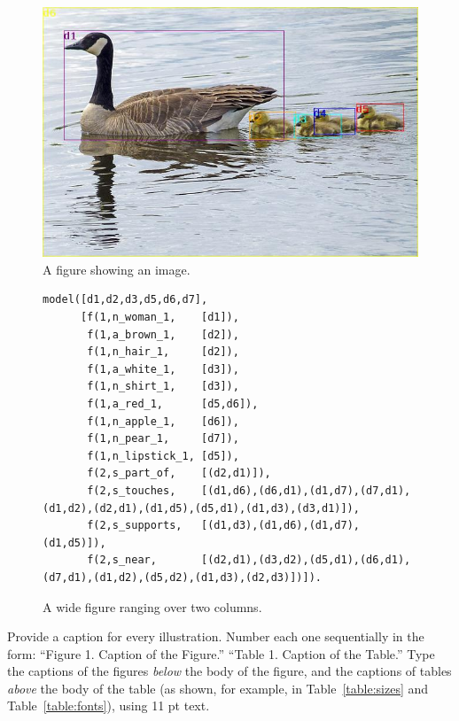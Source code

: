 \documentclass[11pt]{article}
\begin{document}
\begin{figure}[hbtp]
\includegraphics[width=\columnwidth]{canada-goose-436090_640_bb.jpg}
\caption{A figure showing an image.\label{fig:geese}}
\end{figure}

\begin{figure}[hbtp]
\scriptsize
\noindent\makebox[\linewidth]{\rule{\textwidth}{1pt}}
\begin{verbatim}
model([d1,d2,d3,d5,d6,d7],
      [f(1,n_woman_1,    [d1]),
       f(1,a_brown_1,    [d2]),
       f(1,n_hair_1,     [d2]),
       f(1,a_white_1,    [d3]),
       f(1,n_shirt_1,    [d3]),
       f(1,a_red_1,      [d5,d6]),
       f(1,n_apple_1,    [d6]),
       f(1,n_pear_1,     [d7]),
       f(1,n_lipstick_1, [d5]),
       f(2,s_part_of,    [(d2,d1)]),
       f(2,s_touches,    [(d1,d6),(d6,d1),(d1,d7),(d7,d1),(d1,d2),(d2,d1),(d1,d5),(d5,d1),(d1,d3),(d3,d1)]),
       f(2,s_supports,   [(d1,d3),(d1,d6),(d1,d7),(d1,d5)]),
       f(2,s_near,       [(d2,d1),(d3,d2),(d5,d1),(d6,d1),(d7,d1),(d1,d2),(d5,d2),(d1,d3),(d2,d3)])]).
\end{verbatim}
\noindent\makebox[\linewidth]{\rule{\textwidth}{1pt}}
\caption{A wide figure ranging over two columns.\label{fig:wide}}
\end{figure}


Provide a caption for every illustration. Number each one sequentially
in the form: ``Figure 1. Caption of the Figure.''  ``Table 1.  Caption
of the Table.''  Type the captions of the figures \textit{below} the
body of the figure, and the captions of tables \textit{above} the body
of the table (as shown, for example, in Table~\ref{table:sizes} and
Table~\ref{table:fonts}), using 11 pt text.
\end{document}
